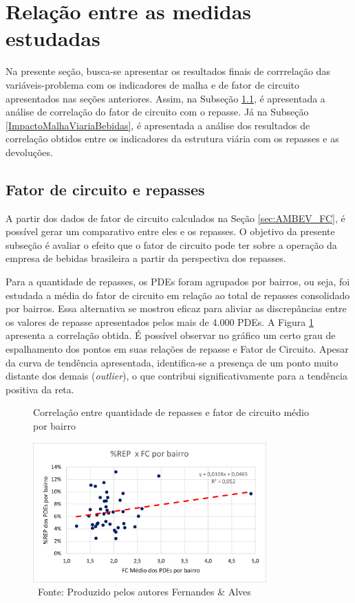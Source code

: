 \section{Relação entre as medidas estudadas} \label{sec:relMetricasBebidas}

Na presente seção, busca-se apresentar os resultados finais de corrrelação das variáveis-problema com os indicadores de malha e de fator de circuito apresentados nas seções anteriores. Assim, na Subseção \ref{FC_repBebidas}, é apresentada a análise de correlação do fator de circuito com o repasse. Já na Subseção \ref{ImpactoMalhaViariaBebidas}, é apresentada a análise dos resultados de correlação obtidos entre os indicadores da estrutura viária com os repasses e as devoluções.

\subsection{Fator de circuito e repasses} \label{FC_repBebidas}

A partir dos dados de fator de circuito calculados na Seção \ref{sec:AMBEV_FC}, é possível gerar um comparativo entre eles e os repasses. O objetivo da presente subseção é avaliar o efeito que o fator de circuito pode ter sobre a operação da empresa de bebidas brasileira a partir da perspectiva dos repasses.

Para a quantidade de repasses, os PDEs foram agrupados por bairros, ou seja, foi estudada a média do fator de circuito em relação ao total de repasses consolidado por bairros. 
%
Essa alternativa se mostrou eficaz para aliviar as discrepâncias entre os valores de repasse apresentados pelos mais de 4.000 PDEs.
%
A Figura \ref{fig:FC_repasse} apresenta a correlação obtida.
%
É possível observar no gráfico um certo grau de espalhamento dos pontos em suas relações de repasse e Fator de Circuito. 
Apesar da curva de tendência apresentada, identifica-se a presença de um ponto muito distante dos demais (\textit{outlier}), o que contribui significativamente para a tendência positiva da reta.

\begin{figure}[htb]
    \centering
    \caption{Correlação entre quantidade de repasses e fator de circuito médio por bairro}
    \includegraphics[width=0.8\textwidth]{images/5_emp_bebidas/excel_based/FC_bairros_novo.png}
    \caption*{\ Fonte: Produzido pelos autores Fernandes \& Alves}
    \label{fig:FC_repasse}
\end{figure}


